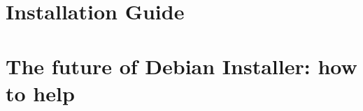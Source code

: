 \documentclass{beamer}
\begin{document}

\section{Installation Guide}

\begin{frame}
  \frametitle{}
\end{frame}


\section{The future of Debian Installer: how to help}

\begin{frame}
  \frametitle{}
\end{frame}
\end{document}
